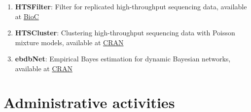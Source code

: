 \documentclass[11pt, a4paper]{awesome-cv}
\begin{document}
\begin{enumerate}
\item
  \textbf{HTSFilter}: Filter for replicated high-throughput sequencing
  data, available at
  \href{http://www.bioconductor.org/packages/release/bioc/html/HTSFilter.html}{BioC}\\
\item
  \textbf{HTSCluster}: Clustering high-throughput sequencing data with
  Poisson mixture models, available at
  \href{http://cran.r-project.org/web/packages/HTSCluster}{CRAN}\\
\item
  \textbf{ebdbNet}: Empirical Bayes estimation for dynamic Bayesian
  networks, available at
  \href{http://cran.r-project.org/web/packages/ebdbNet}{CRAN}
\end{enumerate}

\hypertarget{administrative-activities}{%
\section{Administrative activities}\label{administrative-activities}}
\end{document}
